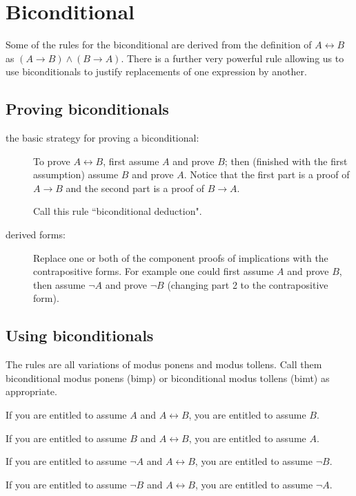 \documentclass[12pt]{book}
\begin{document}
\section{Biconditional}

Some of the rules for the biconditional are derived from the definition of $A \leftrightarrow B$ as $(A \rightarrow B) \wedge (B \rightarrow A)$.  There is a further very powerful rule allowing us to use biconditionals to justify replacements of one expression by another.

\subsection{Proving biconditionals}

\begin{description}

\item[the basic strategy for proving a biconditional:]  To prove $A \leftrightarrow B$, first assume $A$ and prove $B$; then (finished with the first assumption) assume $B$ and prove $A$.  Notice that the first part is a proof of $A \rightarrow B$ and the second part is a proof of $B \rightarrow A$.

Call this rule ``biconditional deduction".

\item[derived forms:]  Replace one or both of the component proofs of implications with the contrapositive forms.  For example one could first
assume $A$ and prove $B$, then assume $\neg A$ and prove $\neg B$ (changing part 2 to the contrapositive form).

\end{description}

\subsection{Using biconditionals}  The rules are all variations of modus ponens and modus tollens.   Call them biconditional modus ponens (bimp)
or biconditional modus tollens (bimt) as appropriate.

If you are entitled to assume $A$ and $A \leftrightarrow B$, you are entitled to assume $B$.

If you are entitled to assume $B$ and $A \leftrightarrow B$, you are entitled to assume $A$.

If you are entitled to assume $\neg A$ and $A \leftrightarrow B$, you are entitled to assume $\neg B$.

If you are entitled to assume $\neg B$ and $A \leftrightarrow B$, you are entitled to assume $\neg A$.
\end{document}
